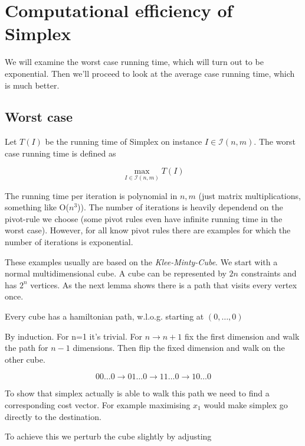 \section{Computational efficiency of Simplex}

We will examine the worst case running time, which will turn out to be exponential. Then we'll proceed to look at the average case running time, which is much better.

\subsection{Worst case}

\begin{Def} Let $T(I)$ be the running time of Simplex on instance $I\in \mathcal{I}(n,m)$. The worst case running time is defined as

\[\max_{I\in \mathcal{I}(n,m)} T(I)\]
\end{Def}

The running time per iteration is polynomial in $n,m$ (just matrix multiplications, something like O($n^3$)). The number of iterations is heavily dependend on the pivot-rule we choose (some pivot rules even have infinite running time in the worst case). However, for all know pivot rules there are examples for which the number of iterations is exponential.

These examples usually are based on the \emph{Klee-Minty-Cube}. We start with a normal multidimensional cube. A cube can be represented by $2n$ constraints and has $2^n$ vertices. As the next lemma shows there is a path that visits every vertex once.

\begin{lem} Every cube has a hamiltonian path, w.l.o.g. starting at $(0,\ldots,0)$\end{lem}

\begin{pr} By induction. For n=1 it's trivial. For $n\rightarrow n+1$ fix the first dimension and walk the path for $n-1$ dimensions. Then flip the fixed dimension and walk on the other cube. 

\[00\ldots0 \rightarrow 01\ldots0 \rightarrow 11\ldots 0 \rightarrow 10\ldots0\]
\end{pr}

To show that simplex actually is able to walk this path we need to find a corresponding cost vector. For example maximising $x_1$ would make simplex go directly to the destination.

To achieve this we perturb the cube slightly by adjusting 

